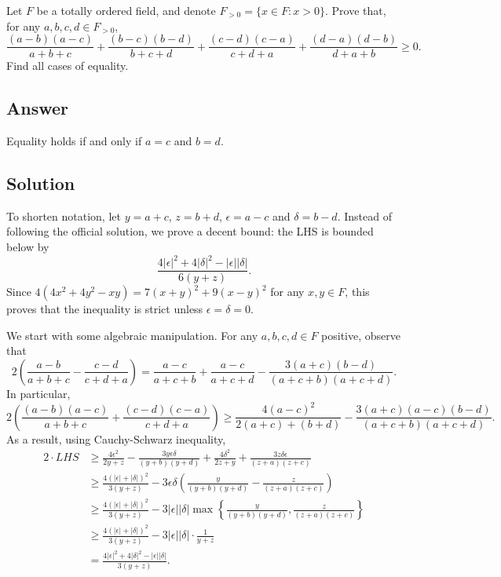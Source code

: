 Let $F$ be a totally ordered field, and denote $F_{>0} = \{x \in F : x > 0\}$.
Prove that, for any $a, b, c, d \in F_{>0}$,
\[ \frac{(a - b)(a - c)}{a + b + c} + \frac{(b - c)(b - d)}{b + c + d} + \frac{(c - d)(c - a)}{c + d + a} + \frac{(d - a)(d - b)}{d + a + b} \geq 0. \tag{*}\label{2008a7-eq0} \]
Find all cases of equality.



\subsection*{Answer}

Equality holds if and only if $a = c$ and $b = d$.



\subsection*{Solution}

To shorten notation, let $y = a + c$, $z = b + d$, $\epsilon = a - c$ and $\delta = b - d$.
Instead of following the official solution, we prove a decent bound: the LHS is bounded below by
\[ \frac{4|\epsilon|^2 + 4|\delta|^2 - |\epsilon||\delta|}{6 (y + z)}. \]
Since $4(4x^2 + 4y^2 - xy) = 7(x + y)^2 + 9(x - y)^2$ for any $x, y \in F$, this proves that the inequality is strict unless $\epsilon = \delta = 0$.

We start with some algebraic manipulation.
For any $a, b, c, d \in F$ positive, observe that
\[ 2\left(\frac{a - b}{a + b + c} - \frac{c - d}{c + d + a}\right) = \frac{a - c}{a + c + b} + \frac{a - c}{a + c + d} - \frac{3(a + c)(b - d)}{(a + c + b)(a + c + d)}. \]
In particular,
\[ 2\left(\frac{(a - b)(a - c)}{a + b + c} + \frac{(c - d)(c - a)}{c + d + a}\right) \geq \frac{4(a - c)^2}{2(a + c) + (b + d)} - \frac{3(a + c)(a - c)(b - d)}{(a + c + b)(a + c + d)}. \]
As a result, using Cauchy-Schwarz inequality,
\begin{align*}
    2 \cdot LHS
    &\geq \frac{4 \epsilon^2}{2y + z} - \frac{3y \epsilon \delta}{(y + b)(y + d)} + \frac{4 \delta^2}{2z + y} + \frac{3z \delta \epsilon}{(z + a)(z + c)} \\
    &\geq \frac{4(|\epsilon| + |\delta|)^2}{3(y + z)} - 3 \epsilon \delta \left(\frac{y}{(y + b)(y + d)} - \frac{z}{(z + a)(z + c)}\right) \\
    &\geq \frac{4(|\epsilon| + |\delta|)^2}{3(y + z)} - 3 |\epsilon| |\delta| \max\left\{\frac{y}{(y + b)(y + d)}, \frac{z}{(z + a)(z + c)}\right\} \\
    &\geq \frac{4(|\epsilon| + |\delta|)^2}{3(y + z)} - 3 |\epsilon| |\delta| \cdot \frac{1}{y + z} \\
    &= \frac{4|\epsilon|^2 + 4|\delta|^2 - |\epsilon||\delta|}{3 (y + z)}.
\end{align*}





